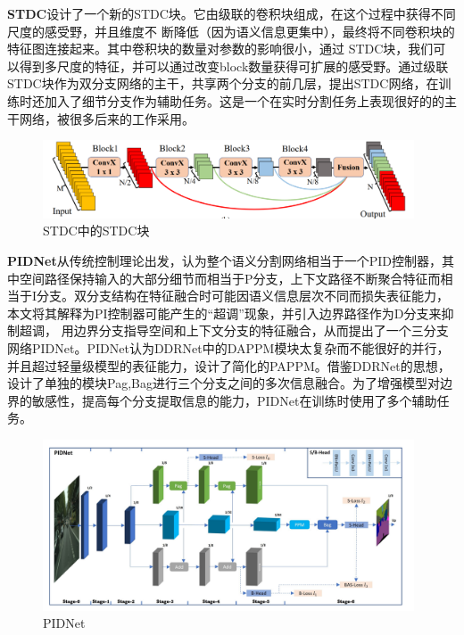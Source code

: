 \documentclass[11pt]{article}
\begin{document}
\textbf{STDC}\cite{ref40}设计了一个新的STDC块。它由级联的卷积块组成，在这个过程中获得不同尺度的感受野，并且维度不
断降低（因为语义信息更集中），最终将不同卷积块的特征图连接起来。其中卷积块的数量对参数的影响很小，通过
STDC块，我们可以得到多尺度的特征，并可以通过改变block数量获得可扩展的感受野。通过级联STDC块作为双分支网络的主干，共享两个分支的前几层，提出STDC网络，在训练时还加入了细节分支作为辅助任务。这是一个在实时分割任务上表现很好的的主干网络，被很多后来的工作采用。

\begin{figure}[H]
    \centering
    \includegraphics[width=11cm]{stdc.png}
    \centering
    \caption{STDC\cite{ref40}中的STDC块}
\end{figure}
\textbf{PIDNet}\cite{ref41}从传统控制理论出发，认为整个语义分割网络相当于一个PID控制器，其中空间路径保持输入的大部分细节而相当于P分支，上下文路径不断聚合特征而相当于I分支。双分支结构在特征融合时可能因语义信息层次不同而损失表征能力，本文将其解释为PI控制器可能产生的“超调”现象，并引入边界路径作为D分支来抑制超调，
用边界分支指导空间和上下文分支的特征融合，从而提出了一个三分支网络PIDNet。PIDNet认为DDRNet中的DAPPM模块太复杂而不能很好的并行，并且超过轻量级模型的表征能力，设计了简化的PAPPM。借鉴DDRNet的思想，设计了单独的模块Pag,Bag进行三个分支之间的多次信息融合。为了增强模型对边界的敏感性，提高每个分支提取信息的能力，PIDNet在训练时使用了多个辅助任务。
\begin{figure}[!h]
    \centering
    \includegraphics[width=11cm]{pid.png}
\centering
\caption{PIDNet\cite{ref41}}
\end{figure}
\end{document}
